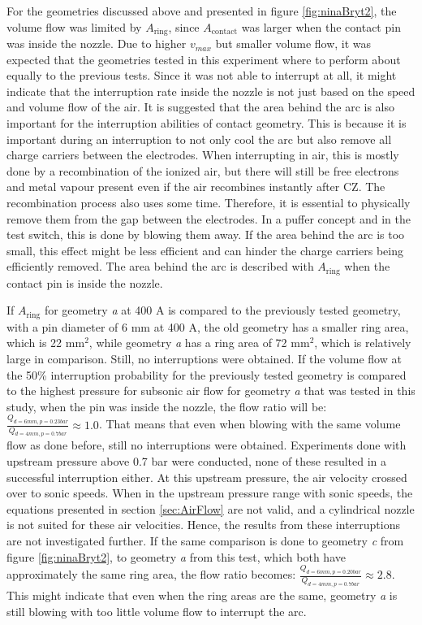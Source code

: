 \documentclass[10pt,a4paper,twoside]{article}
\begin{document}
For the geometries discussed above and presented in figure \ref{fig:ninaBryt2}, the volume flow was limited by $A_\mathrm{{ring}}$, since $A_\mathrm{{contact}}$ was larger when the contact pin was inside the nozzle. Due to higher $v_{max}$ but smaller volume flow, it was expected that the geometries tested in this experiment where to perform about equally to the previous tests. Since it was not able to interrupt at all, it might indicate that the interruption rate inside the nozzle is not just based on the speed and volume flow of the air. It is suggested that the area behind the arc is also important for the interruption abilities of contact geometry. This is because it is important during an interruption to not only cool the arc but also remove all charge carriers between the electrodes. When interrupting in air, this is mostly done by a recombination of the ionized air, but there will still be free electrons and metal vapour present even if the air recombines instantly after CZ. The recombination process also uses some time. Therefore, it is essential to physically remove them from the gap between the electrodes. In a puffer concept and in the test switch, this is done by blowing them away. If the area behind the arc is too small, this effect might be less efficient and can hinder the charge carriers being efficiently removed. The area behind the arc is described with $A_\mathrm{{ring}}$ when the contact pin is inside the nozzle.

If $A_\mathrm{{ring}}$ for geometry \textit{a} at 400 A is compared to the previously tested geometry, with a pin diameter of 6 mm at 400 A, the old geometry has a smaller ring area, which is 22 $\mathrm{{mm^2}}$, while geometry \textit{a} has a ring area of 72 $\mathrm{{mm^2}}$, which is relatively large in comparison. Still, no interruptions were obtained. If the volume flow at the 50\% interruption probability for the previously tested geometry is compared to the highest pressure for subsonic air flow for geometry \textit{a} that was tested in this study, when the pin was inside the nozzle, the flow ratio will be: $\frac{Q_{d=6 mm, p=0.23 bar}}{Q_{d=4 mm, p=0.7 bar}}\approx 1.0$. That means that even when blowing with the same volume flow as done before, still no interruptions were obtained. Experiments done with upstream pressure above 0.7 bar were conducted, none of these resulted in a successful interruption either. At this upstream pressure, the air velocity crossed over to sonic speeds. When in the upstream pressure range with sonic speeds, the equations presented in section \ref{sec:AirFlow} are not valid, and a cylindrical nozzle is not suited for these air velocities. Hence, the results from these interruptions are not investigated further. If the same comparison is done to geometry \textit{c} from figure \ref{fig:ninaBryt2}, to geometry \textit{a} from this test, which both have approximately the same ring area, the flow ratio becomes: $\frac{Q_{d=6 mm, p=0.20 bar}}{Q_{d=4 mm, p=0.7 bar}}\approx 2.8$. This might indicate that even when the ring areas are the same, geometry \textit{a} is still blowing with too little volume flow to interrupt the arc.
\end{document}
